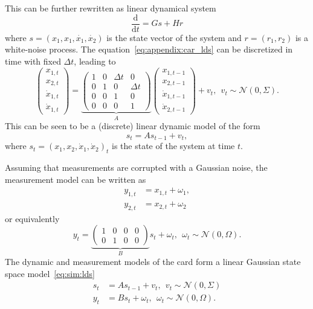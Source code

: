 This can be further rewritten as linear dynamical system
  \begin{equation}
    \label{eq:appendix:car_lds} \frac{\mathrm{d}}{\mathrm{d} t} = G s + H r
  \end{equation}
  where
  $s = (x_1, x_1, \dot{x_1}, \dot{x_2})$ is the state vector of the system and $r = (r_1, r_2)$
  is a white-noise process.
The equation~\ref{eq:appendix:car_lds} can be discretized in time with fixed $\Delta t$,
  leading to \begin{equation}
  \begin{pmatrix}
    x_{1, t} \\ x_{2, t} \\ \dot{x}_{1, t} \\
    \dot{x}_{1, t}
  \end{pmatrix}
  = \underbrace{
    \begin{pmatrix}
      1 & 0        & \Delta t & 0 \\ 0 & 1                            & 0
        & \Delta t                \\ 0 & 0 & 1 & 0 \\ 0 & 0 & 0 & 1
    \end{pmatrix}
  }_{A}
  \begin{pmatrix}
    x_{1, t - 1}
    \\ x_{2, t - 1} \\ \dot{x}_{1, t - 1} \\ \dot{x}_{2, t - 1}
  \end{pmatrix}
  +
  v_t,~~v_{t} \sim \mathcal{N}(0, \Sigma).
\end{equation}
This can be seen to be a (discrete) linear dynamic model of the form
  \begin{equation}
    s_t = A
    s_{t - 1} + v_t,
  \end{equation}
  where $s_t = (x_1, x_2, \dot{x}_1, \dot{x}_2)_t$ is the
  state of the system at time $t$.

Assuming that measurements are corrupted with a Gaussian noise, the measurement model can be
  written as
  \begin{equation}
    \begin{aligned}
      y_{1, t} & = x_{1, t} + \omega_1, \\ y_{2, t} & =
         x_{2, t} + \omega_2
    \end{aligned}
  \end{equation}
  or equivalently \begin{equation} y_t =
  \underbrace{
    \begin{pmatrix}
      1 & 0 & 0 & 0 \\ 0 & 1 & 0 & 0
    \end{pmatrix}
  }_{B} s_t +
  \omega_t,~~\omega_t \sim \mathcal{N}(0, \Omega).
\end{equation}
The dynamic and measurement models of the card form a linear Gaussian state space
  model~\eqref{eq:sim:lds} \begin{equation} \begin{aligned} s_t &= A s_{t - 1} + v_t,~~v_t
  \sim \mathcal{N}(0, \Sigma) \\ y_t &= B s_{t} + \omega_t,~~\omega_t \sim \mathcal{N}(0, \Omega).
\end{aligned}
\end{equation}
